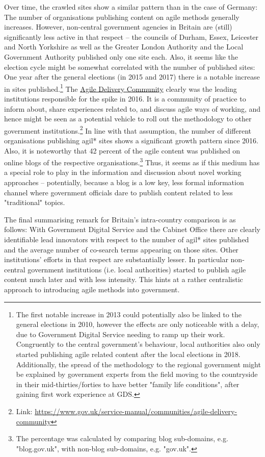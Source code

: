 Over time, the crawled sites show a similar pattern than in the case of Germany: The number of organisations publishing content on agile methods generally increases. However, non-central government agencies in Britain are (still) significantly less active in that respect – the councils of Durham, Essex, Leicester and North Yorkshire as well as the Greater London Authority and the Local Government Authority published only one site each. Also, it seems like the election cycle might be somewhat correlated with the number of published sites: One year after the general elections (in 2015 and 2017) there is a notable increase in sites published.\footnote{The first notable increase in 2013 could potentially also be linked to the general elections in 2010, however the effects are only noticeable with a delay, due to Government Digital Service needing to ramp up their work. Congruently to the central government's behaviour, local authorities also only started publishing agile related content after the local elections in 2018. Additionally, the spread of the methodology to the regional government might be explained by government experts from the field moving to the countryside in their mid-thirties/forties to have better "family life conditions", after gaining first work experience at GDS.} The \href{https://www.gov.uk/service-manual/communities/agile-delivery-community}{Agile Delivery Community} clearly was the leading institutions responsible for the spike in 2016. It is a community of practice to inform about, share experiences related to, and discuss agile ways of working, and hence might be seen as a potential vehicle to roll out the methodology to other government institutions.\footnote{Link: \url{https://www.gov.uk/service-manual/communities/agile-delivery-community}} In line with that assumption, the number of different organisations publishing agil* sites shows a significant growth pattern since 2016. Also, it is noteworthy that 42 percent of the agile content was published on online blogs of the respective organisations.\footnote{The percentage was calculated by comparing blog sub-domains, e.g. "blog.gov.uk", with non-blog sub-domains, e.g. "gov.uk".} Thus, it seems as if this medium has a special role to play in the information and discussion about novel working approaches – potentially, because a blog is a low key, less formal information channel where government officials dare to publish content related to less "traditional" topics.

The final summarising remark for Britain's intra-country comparison is as follows: With Government Digital Service and the Cabinet Office there are clearly identifiable lead innovators with respect to the number of agil* sites published and the average number of co-search terms appearing on those sites. Other institutions' efforts in that respect are substantially lesser. In particular non-central government institutions (i.e. local authorities) started to publish agile content much later and with less intensity. This hints at a rather centralistic approach to introducing agile methods into government.
\newpage
